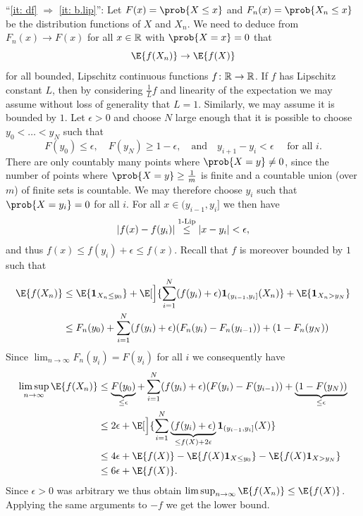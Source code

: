 \begin{myproof}
    ``\ref{it: df} \(\Rightarrow\) \ref{it: b.lip}'':
    Let \(F(x) = \prob{X\le x}\) and \(F_n(x) = \prob{X_n \le x}\) be the
    distribution functions of \(X\) and \(X_n\). We need to deduce from
    \(F_n(x) \to F(x)\) for all \(x\in \mathbb{R}\) with \(\prob{X = x} = 0\) that
    \[
        \E{f(X_n)} \to \E{f(X)}
    \]
    for all bounded, Lipschitz continuous functions \(f\colon \mathbb{R} \to \mathbb{R}\).
    If \(f\) has Lipschitz constant \(L\), then by considering \(\frac1L f\) and
    linearity of the expectation we may assume without loss of generality that
    \(L=1\). Similarly, we may assume it is bounded by \(1\). Let \(\epsilon > 0\) and choose \(N\) large enough that it is possible to choose
    \(y_0 < \ldots < y_N\) such that
    \[
        F(y_0) \le \epsilon,\quad F(y_N) \ge 1 - \epsilon,
        \quad\text{and}\quad
        y_{i+1} - y_i < \epsilon\quad  \text{ for all } i.
    \]
    There are only countably many points where \(\prob{X = y} \neq 0\),
    since the number of points where \(\prob{X=y} \ge \tfrac1m\) is finite and a
    countable union (over \(m\)) of finite sets is countable.  We may therefore
    choose \(y_i\) such that \(\prob{X = y_i} = 0\) for all \(i\).
    For all \(x\in (y_{i-1}, y_i]\) we then have
    \[
        \lvert f(x) - f(y_i)\rvert \overset{1\text{-Lip}}\le \lvert x-y_i\rvert < \epsilon,
    \]
    and thus \(f(x) \le f(y_i) + \epsilon \le f(x)\). Recall that \(f\) is moreover bounded
    by \(1\) such that
    \[\begin{aligned}
        \E{f(X_n)}
        &\le \E{\ind{X_n \le y_0}} + \E[\Big]{\sum_{i=1}^N (f(y_i) +\epsilon)\ind{(y_{i-1}, y_i]}(X_n)}
        + \E{\ind{X_n > y_N}}
        \\
        &\le F_n(y_0) + \sum_{i=1}^N (f(y_i) + \epsilon) (F_n(y_i) - F_n(y_{i-1})) + (1 - F_n(y_N))
    \end{aligned}
    \]
    Since \(\lim_{n\to \infty} F_n(y_i) = F(y_i)\) for all \(i\) we consequently have
    \[\begin{aligned}
        \limsup_{n\to \infty} \E{f(X_n)}
        &\le \underbrace{F(y_0)}_{\le \epsilon} + \sum_{i=1}^N (f(y_i) + \epsilon) (F(y_i) - F(y_{i-1})) + \underbrace{(1 - F(y_N))}_{\le \epsilon}
        \\
        &\le 2\epsilon + \E[\Big]{\sum_{i=1}^N \underbrace{(f(y_i) + \epsilon)}_{\le f(X) + 2\epsilon} \ind{(y_{i-1}, y_i]}(X)}
        \\
        &\le 4\epsilon + \E{f(X)} - \E{f(X) \ind{X \le y_0}} - \E{f(X) \ind{X > y_N}}
        \\
        &\le 6\epsilon + \E{f(X)}.
    \end{aligned}
    \]
    Since \(\epsilon>0\) was arbitrary we thus obtain \(\limsup_{n\to \infty}
    \E{f(X_n)} \le \E{f(X)}\). Applying the same arguments to \(-f\) we get the
    lower bound.
\end{myproof}




